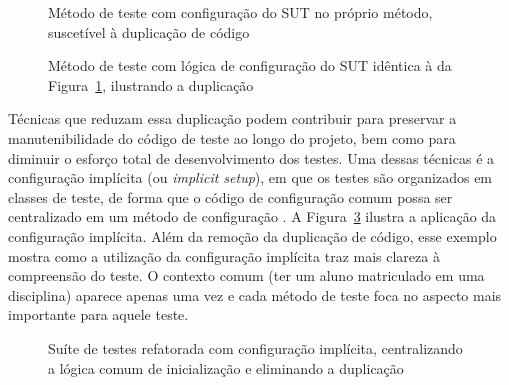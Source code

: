 \begin{figure}[htb]
	\centering
	
	\caption{Método de teste com configuração do SUT no próprio método, suscetível à duplicação de código}
	\label{code:1-cancel-student-enrollment-test}
\end{figure}

\begin{figure}[htb]
	\centering
	
	\caption{Método de teste com lógica de configuração do SUT idêntica à da Figura~\ref{code:1-cancel-student-enrollment-test}, ilustrando a duplicação}
	\label{code:2-enroll-student-twice-test}
\end{figure}

Técnicas que reduzam essa duplicação podem contribuir para preservar a manutenibilidade do código de teste ao longo do projeto, bem como para diminuir o esforço total de desenvolvimento dos testes. Uma dessas técnicas é a configuração implícita (ou \textit{implicit setup}), em que os testes são organizados em classes de teste, de forma que o código de configuração comum possa ser centralizado em um método de configuração \cite{meszaros:2007}. A Figura~\ref{code:3-university-tests} ilustra a aplicação da configuração implícita. Além da remoção da duplicação de código, esse exemplo mostra como a utilização da configuração implícita traz mais clareza à compreensão do teste. O contexto comum (ter um aluno matriculado em uma disciplina) aparece apenas uma vez e cada método de teste foca no aspecto mais importante para aquele teste.

\begin{figure}[htb]
	\centering
	
	\caption{Suíte de testes refatorada com configuração implícita, centralizando a lógica comum de inicialização e eliminando a duplicação}
	\label{code:3-university-tests}
\end{figure}

